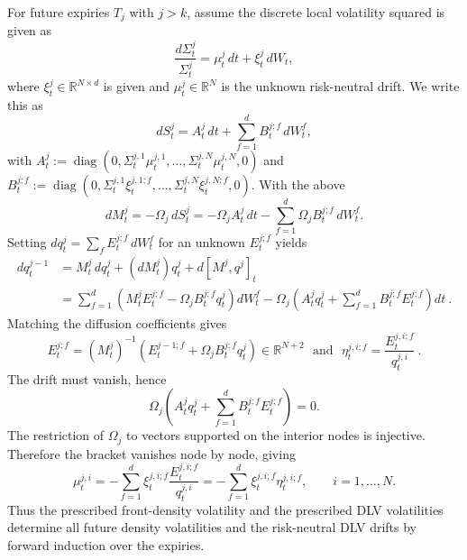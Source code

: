 \documentclass[11pt]{article}
\theoremstyle{plain}
\theoremstyle{definition}
\theoremstyle{remark}
\begin{document}
      For future expiries $T_j$ with $j>k$, assume the discrete local volatility squared is given as
      \begin{equation}
        \label{eq:dlv_sde_hb}
        \frac{ d\Sigma_t^{j} }{ \Sigma_t^{j} }
          = \mu^j_t\,dt
          + \xi^j_t\,dW_t,
      \end{equation}
      where $\xi_t^j\in\mathbb R^{N\times d}$ is given and
      $\mu_t^j\in\mathbb R^N$ is the unknown risk-neutral drift. We write this as
      \[
        dS_t^j=A_t^j\,dt+\sum_{f=1}^dB_t^{j;f}\,dW_t^f,
      \]
      with
        $A_t^j
        :=\operatorname{diag}(0,\Sigma_t^{j,1}\mu_t^{j,1},\ldots,
            \Sigma_t^{j,N}\mu_t^{j,N},0)$ and $B_t^{j;f}
        :=\operatorname{diag}(0,\Sigma_t^{j,1}\xi_t^{j,1;f},\ldots,
            \Sigma_t^{j,N}\xi_t^{j,N;f},0).$
      With the above
      \[
        dM_t^j=-\Omega_j\,dS_t^j
        =-\Omega_jA_t^j\,dt
        -\sum_{f=1}^d\Omega_jB_t^{j;f}\,dW_t^f.
      \]
      Setting $dq_t^j=\sum_fE_t^{j;f}\,dW_t^f$ for an unknown $E_t^{j;f}$ yields
      \begin{align}
        dq_t^{j-1}
        &= M_t^j\,dq_t^j+(dM_t^j)q_t^j+d[M^j,q^j]_t\\
        &= \sum_{f=1}^d
          \left(M_t^jE_t^{j;f}-\Omega_jB_t^{j;f}q_t^j\right)dW_t^f
          -\Omega_j\left(A_t^jq_t^j
          +\sum_{f=1}^dB_t^{j;f}E_t^{j;f}\right)dt \ .
      \end{align}
      Matching the diffusion coefficients gives
      \begin{equation}
        \label{eq:vol_hb}
        E_t^{j;f}
        =(M_t^j)^{-1}
          \left(E_t^{j-1;f}+\Omega_jB_t^{j;f}q_t^j\right)
        \in\mathbb R^{N+2} \ \ \ \mbox{and} \ \ \ \eta_t^{j,i;f}=\frac{ E_t^{j,i;f} }{ q_t^{j,i} } \ .
      \end{equation}
      The drift must vanish, hence
      \[
        \Omega_j\left(A_t^jq_t^j
        +\sum_{f=1}^dB_t^{j;f}E_t^{j;f}\right)=0.
      \]
      The restriction of $\Omega_j$ to vectors supported on the interior nodes
      is injective. Therefore the bracket vanishes node by node, giving
      \begin{equation}
        \label{eq:drift_hb}
        \mu_t^{j,i}
        =-\sum_{f=1}^d\xi_t^{j,i;f}
          \frac{E_t^{j,i;f}}{q_t^{j,i}}
        =-\sum_{f=1}^d\xi_t^{j,i;f}\eta_t^{j,i;f},
        \qquad i=1,\ldots,N.
      \end{equation}
      Thus the prescribed front-density volatility and the prescribed DLV
      volatilities determine all future density volatilities and the
      risk-neutral DLV drifts by forward induction over the expiries.
  
\end{document}
